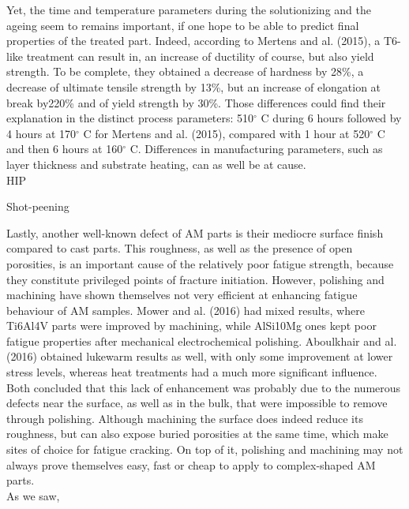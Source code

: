 Yet, the time and temperature parameters during the solutionizing and the ageing seem to remains important, if one hope to be able to predict final properties of the treated part. Indeed, according to Mertens and al. (2015)\cite{mertens15}, a T6-like treatment can result in, an increase of ductility of course, but also yield strength. To be complete, they obtained a decrease of hardness by 28\%, a decrease of ultimate tensile strength by 13\%, but an increase of elongation at break by220\% and of yield strength by 30\%. Those differences could find their explanation in the distinct process parameters: 510$^\circ$ C during 6 hours followed by 4 hours at 170$^\circ$ C for Mertens and al. (2015)\cite{mertens15}, compared with 1 hour at 520$^\circ$ C and then 6 hours at 160$^\circ$ C. Differences in manufacturing parameters, such as layer thickness and substrate heating, can as well be at cause.\\

HIP

Shot-peening

Lastly, another well-known defect of AM parts is their mediocre surface finish compared to cast parts. This roughness, as well as the presence of open porosities, is an important cause of the relatively poor fatigue strength, because they constitute privileged points of fracture initiation. However, polishing and machining have shown themselves not very efficient at enhancing fatigue behaviour of AM samples. Mower and al. (2016)\cite{MOWER2016198} had mixed results, where Ti6Al4V parts were improved by machining, while AlSi10Mg ones kept poor fatigue properties after mechanical electrochemical polishing. Aboulkhair and al. (2016) \cite{ABOULKHAIR2016bis} obtained lukewarm results as well, with only some improvement at lower stress levels, whereas heat treatments had a much more significant influence. Both concluded that this lack of enhancement was probably due to the numerous defects near the surface, as well as in the bulk, that were impossible to remove through polishing. Although machining the surface does indeed reduce its roughness, but can also expose buried porosities at the same time, which make sites of choice for fatigue cracking. On top of it, polishing and machining may not always prove themselves easy, fast or cheap to apply to complex-shaped AM parts.\\

As we saw, 

